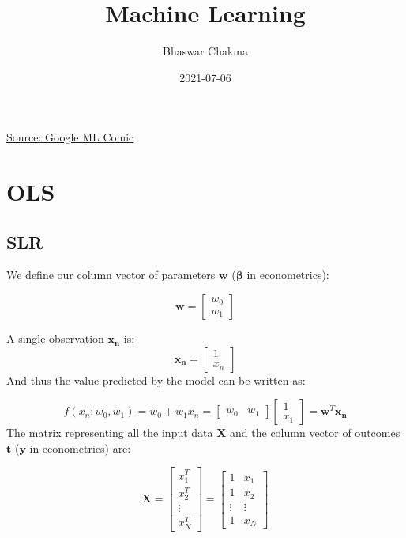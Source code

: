 \documentclass[
]{book}
\title{Machine Learning}
\author{Bhaswar Chakma}
\date{2021-07-06}
\begin{document}
\maketitle

{
\setcounter{tocdepth}{1}
\tableofcontents
}
\hypertarget{section}{%
\chapter*{}\label{section}}

\href{https://cloud.google.com/products/ai/ml-comic-1/}{Source: Google ML Comic}

\hypertarget{ols}{%
\chapter{OLS}\label{ols}}

\hypertarget{slr}{%
\section{SLR}\label{slr}}

We define our column vector of parameters \(\mathbf{w}\) (\(\boldsymbol{\beta}\) in econometrics):

\[\mathbf{w} = \begin{bmatrix}
           w_{0} \\
           w_{1} 
         \end{bmatrix}\]

A single observation \(\mathbf{x_n}\) is:
\[
  \mathbf{x_n} =
  \begin{bmatrix}
          1 \\
          x_{n} 
  \end{bmatrix}
\]
And thus the value predicted by the model can be written as:

\[
  f(x_n; w_0, w_1) = 
  w_0 + w_1x_n = 
  \begin{bmatrix}
  w_0 & w_1
  \end{bmatrix}
  \begin{bmatrix}
  1 \\ x_1
  \end{bmatrix} = 
  \mathbf{w}^T\mathbf{x_n}
\]
The matrix representing all the input data \(\mathbf{X}\) and the column vector of
outcomes \(\mathbf{t}\) (\(\mathbf{y}\) in econometrics) are:

\[
\mathbf{X} = 
\begin{bmatrix}
x_{1}^T \\
x_{2}^T \\
\vdots \\
x_{N}^T
\end{bmatrix}
= \begin{bmatrix}
1 & x_{1} \\
1 & x_{2} \\
\vdots & \vdots\\
1 & x_{N}
\end{bmatrix}
\]
\end{document}
